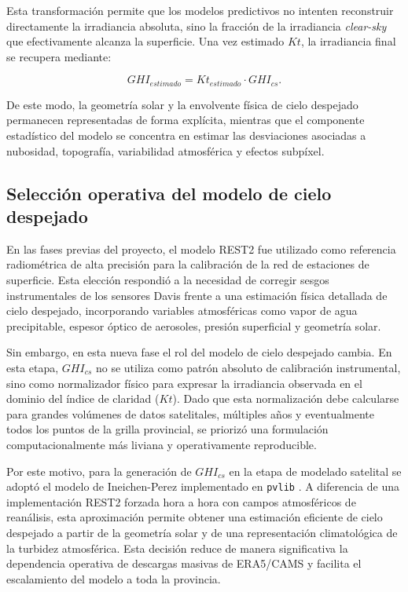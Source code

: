 \documentclass[../main.tex]{subfiles}
\begin{document}
Esta transformación permite que los modelos predictivos no intenten reconstruir directamente la irradiancia absoluta, sino la fracción de la irradiancia \textit{clear-sky} que efectivamente alcanza la superficie. Una vez estimado $Kt$, la irradiancia final se recupera mediante:

\begin{equation}
GHI_{estimado} = Kt_{estimado} \cdot GHI_{cs}.
\end{equation}

De este modo, la geometría solar y la envolvente física de cielo despejado permanecen representadas de forma explícita, mientras que el componente estadístico del modelo se concentra en estimar las desviaciones asociadas a nubosidad, topografía, variabilidad atmosférica y efectos subpíxel.

\subsection{Selección operativa del modelo de cielo despejado}

En las fases previas del proyecto, el modelo REST2 \cite{gueymard2008} fue utilizado como referencia radiométrica de alta precisión para la calibración de la red de estaciones de superficie. Esta elección respondió a la necesidad de corregir sesgos instrumentales de los sensores Davis frente a una estimación física detallada de cielo despejado, incorporando variables atmosféricas como vapor de agua precipitable, espesor óptico de aerosoles, presión superficial y geometría solar.

Sin embargo, en esta nueva fase el rol del modelo de cielo despejado cambia. En esta etapa, $GHI_{cs}$ no se utiliza como patrón absoluto de calibración instrumental, sino como normalizador físico para expresar la irradiancia observada en el dominio del índice de claridad ($Kt$). Dado que esta normalización debe calcularse para grandes volúmenes de datos satelitales, múltiples años y eventualmente todos los puntos de la grilla provincial, se priorizó una formulación computacionalmente más liviana y operativamente reproducible.

Por este motivo, para la generación de $GHI_{cs}$ en la etapa de modelado satelital se adoptó el modelo de Ineichen-Perez \cite{ineichen2002} implementado en \texttt{pvlib} \cite{pvlib}. A diferencia de una implementación REST2 forzada hora a hora con campos atmosféricos de reanálisis, esta aproximación permite obtener una estimación eficiente de cielo despejado a partir de la geometría solar y de una representación climatológica de la turbidez atmosférica. Esta decisión reduce de manera significativa la dependencia operativa de descargas masivas de ERA5/CAMS \cite{hersbach2020} y facilita el escalamiento del modelo a toda la provincia.
\end{document}
